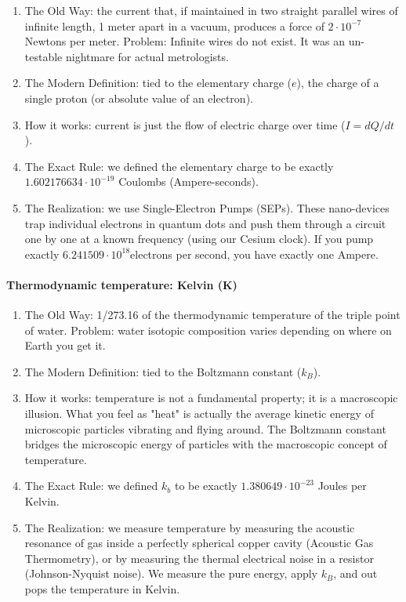 \documentclass[../main.tex]{subfiles}
\begin{document}
\begin{enumerate}
	\item[\textbf{-}] The Old Way: the current that, if maintained in two straight parallel wires of infinite length, 1 meter apart in a vacuum, produces a force of $2 \cdot 10^{-7}$ Newtons per meter. Problem: Infinite wires do not exist. It was an un-testable nightmare for actual metrologists.
	\item[\textbf{-}] The Modern Definition: tied to the elementary charge ($e$), the charge of a single proton (or absolute value of an electron).
	\item[\textbf{-}] How it works: current is just the flow of electric charge over time ($I = dQ / dt$).
	\item[\textbf{-}] The Exact Rule: we defined the elementary charge to be exactly $1.602176634 \cdot 10^{-19}$ Coulombs (Ampere-seconds).
	\item[\textbf{-}] The Realization: we use Single-Electron Pumps (SEPs). These nano-devices trap individual electrons in quantum dots and push them through a circuit one by one at a known frequency (using our Cesium clock). If you pump exactly $6.241509 \cdot 10^{18} $electrons per second, you have exactly one Ampere.
\end{enumerate}

\paragraph{Thermodynamic temperature: Kelvin (K)}

\begin{enumerate}
	\item[\textbf{-}] The Old Way: 1/273.16 of the thermodynamic temperature of the triple point of water. Problem: water isotopic composition varies depending on where on Earth you get it.
	\item[\textbf{-}] The Modern Definition: tied to the Boltzmann constant ($k_B$).
	\item[\textbf{-}] How it works: temperature is not a fundamental property; it is a macroscopic illusion. What you feel as "heat" is actually the average kinetic energy of microscopic particles vibrating and flying around. The Boltzmann constant bridges the microscopic energy of particles with the macroscopic concept of temperature.
	\item[\textbf{-}] The Exact Rule: we defined $k_b$ to be exactly $1.380649 \cdot 10^{-23}$ Joules per Kelvin.
	\item[\textbf{-}] The Realization: we measure temperature by measuring the acoustic resonance of gas inside a perfectly spherical copper cavity (Acoustic Gas Thermometry), or by measuring the thermal electrical noise in a resistor (Johnson-Nyquist noise). We measure the pure energy, apply $k_B$, and out pops the temperature in Kelvin.
\end{enumerate}
\end{document}
